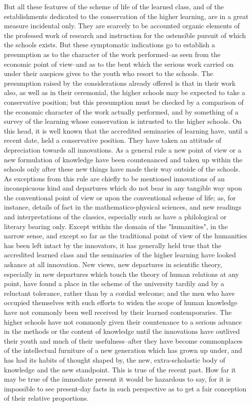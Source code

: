 \documentclass[12pt]{report}
\begin{document}
But all these features of the scheme of life of the learned class,
and of the establishments dedicated to the conservation of the higher
learning, are in a great measure incidental only. They are scarcely
to be accounted organic elements of the professed work of research and
instruction for the ostensible pursuit of which the schools exists. But
these symptomatic indications go to establish a presumption as to the
character of the work performed--as seen from the economic point of
view--and as to the bent which the serious work carried on under their
auspices gives to the youth who resort to the schools. The presumption
raised by the considerations already offered is that in their work also,
as well as in their ceremonial, the higher schools may be expected to
take a conservative position; but this presumption must be checked by a
comparison of the economic character of the work actually performed, and
by something of a survey of the learning whose conservation is
intrusted to the higher schools. On this head, it is well known that
the accredited seminaries of learning have, until a recent date, held
a conservative position. They have taken an attitude of depreciation
towards all innovations. As a general rule a new point of view or a new
formulation of knowledge have been countenanced and taken up within the
schools only after these new things have made their way outside of
the schools. As exceptions from this rule are chiefly to be mentioned
innovations of an inconspicuous kind and departures which do not bear
in any tangible way upon the conventional point of view or upon the
conventional scheme of life; as, for instance, details of fact in the
mathematico-physical sciences, and new readings and interpretations of
the classics, especially such as have a philological or literary bearing
only. Except within the domain of the "humanities", in the narrow sense,
and except so far as the traditional point of view of the humanities has
been left intact by the innovators, it has generally held true that the
accredited learned class and the seminaries of the higher learning
have looked askance at all innovation. New views, new departures in
scientific theory, especially in new departures which touch the theory
of human relations at any point, have found a place in the scheme of
the university tardily and by a reluctant tolerance, rather than by
a cordial welcome; and the men who have occupied themselves with such
efforts to widen the scope of human knowledge have not commonly been
well received by their learned contemporaries. The higher schools have
not commonly given their countenance to a serious advance in the methods
or the content of knowledge until the innovations have outlived their
youth and much of their usefulness--after they have become commonplaces
of the intellectual furniture of a new generation which has grown
up under, and has had its habits of thought shaped by, the new,
extra-scholastic body of knowledge and the new standpoint. This is true
of the recent past. How far it may be true of the immediate present it
would be hazardous to say, for it is impossible to see present-day
facts in such perspective as to get a fair conception of their relative
proportions.
\end{document}

